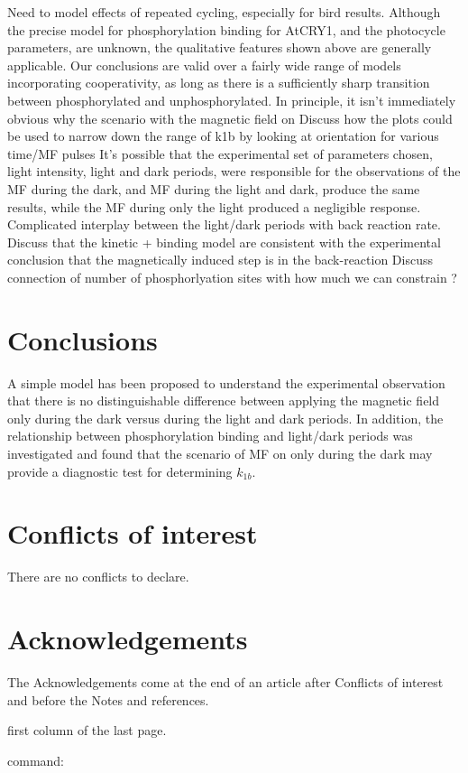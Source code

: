\documentclass[twoside,twocolumn,9pt]{article}
\renewcommand{\refname}{Notes and references}
\begin{document}
Need to model effects of repeated cycling, especially for bird results.
Although the precise model for phosphorylation binding for AtCRY1, and the photocycle parameters, are unknown, the qualitative
features shown above are generally applicable. Our conclusions are valid over a fairly wide range of models incorporating
cooperativity, as long as there is a sufficiently sharp transition between phosphorylated and unphosphorylated. In principle, it
isn't immediately obvious why the scenario with the magnetic field on
Discuss how the plots could be used to narrow down the range of k1b by looking at orientation for various time/MF pulses
It's possible that the experimental set of parameters chosen, light intensity, light and dark periods, were responsible for the
observations of the MF during the dark, and MF during the light and dark, produce the same results, while the MF during only the
light produced a negligible response.
Complicated interplay between the light/dark periods with back reaction rate.
Discuss that the kinetic + binding model are consistent with the experimental conclusion that the magnetically induced step is in
the back-reaction
Discuss connection of number of phosphorlyation sites with how much we can constrain ?

\section{Conclusions}
A simple model has been proposed to  understand the experimental observation that there is no distinguishable difference between
applying the magnetic field only during the dark versus during the light and dark periods. In addition, the relationship between
phosphorylation binding and light/dark periods was investigated and found that the scenario of MF on only during the dark may
provide a diagnostic test for determining $k_{1b}$.

\section*{Conflicts of interest}
There are no conflicts to declare.

\section*{Acknowledgements}
The Acknowledgements come at the end of an article after Conflicts of interest and before the Notes and references.


first column of the last page.

\balance

command:


\end{document}
